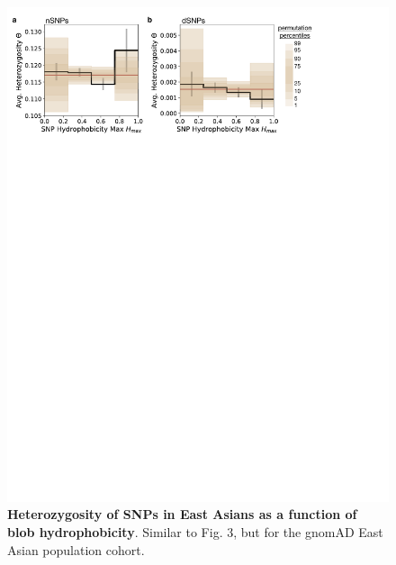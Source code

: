 \documentclass[9pt,twoside,lineno]{pnas-new}
\begin{document}
\begin{figure}[!ht]
\includegraphics[scale=0.5,width=\textwidth,trim={0 0cm 0 0cm},clip]{Figure_S1.pdf}
\caption{{\bf Heterozygosity of SNPs in East Asians as a function of blob hydrophobicity}. Similar to Fig. 3, but for the gnomAD East Asian population cohort.}
\label{S1} 
\end{figure}

\clearpage
\end{document}
